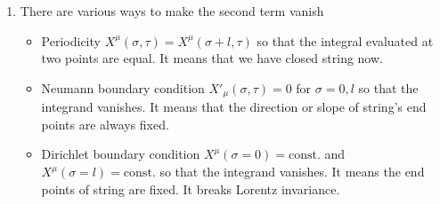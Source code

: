 \begin{enumerate}[label=(\alph*)]
	\item There are various ways to make the second term vanish
		\begin{itemize}
			\item Periodicity $X^\mu (\sigma, \tau) = X^\mu (\sigma + l, \tau)$ so that the integral evaluated at two points are equal. It means that we have closed string now.
			\item Neumann boundary condition $X'_\mu (\sigma, \tau) = 0$ for $\sigma=0, l$ so that the integrand vanishes. It means that the direction or slope of string's end points are always fixed.
			\item Dirichlet boundary condition $X^\mu(\sigma=0) = \text{const.}$ and $X^\mu(\sigma=l) = \text{const.}$ so that the integrand vanishes. It means the end points of string are fixed. It breaks Lorentz invariance.
		\end{itemize}
\end{enumerate}
